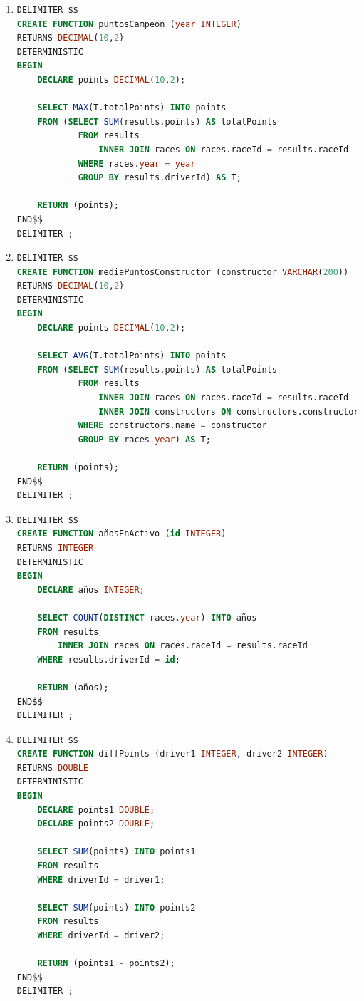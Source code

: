 \documentclass{db-practice}
\begin{document}
\begin{enumerate}
\item
\begin{lstlisting}[language=SQL]
DELIMITER $$
CREATE FUNCTION puntosCampeon (year INTEGER)
RETURNS DECIMAL(10,2)
DETERMINISTIC
BEGIN
    DECLARE points DECIMAL(10,2);

    SELECT MAX(T.totalPoints) INTO points
    FROM (SELECT SUM(results.points) AS totalPoints
            FROM results
                INNER JOIN races ON races.raceId = results.raceId
            WHERE races.year = year
            GROUP BY results.driverId) AS T;
            
    RETURN (points);
END$$
DELIMITER ;
\end{lstlisting}

\item
\begin{lstlisting}[language=SQL]
DELIMITER $$
CREATE FUNCTION mediaPuntosConstructor (constructor VARCHAR(200))
RETURNS DECIMAL(10,2)
DETERMINISTIC
BEGIN
    DECLARE points DECIMAL(10,2);

    SELECT AVG(T.totalPoints) INTO points
    FROM (SELECT SUM(results.points) AS totalPoints
            FROM results
                INNER JOIN races ON races.raceId = results.raceId
                INNER JOIN constructors ON constructors.constructorId = results.constructorId
            WHERE constructors.name = constructor
            GROUP BY races.year) AS T;
            
    RETURN (points);
END$$
DELIMITER ;
\end{lstlisting}

\item
\begin{lstlisting}[language=SQL]
DELIMITER $$
CREATE FUNCTION añosEnActivo (id INTEGER)
RETURNS INTEGER
DETERMINISTIC
BEGIN
    DECLARE años INTEGER;

    SELECT COUNT(DISTINCT races.year) INTO años 
    FROM results
        INNER JOIN races ON races.raceId = results.raceId
    WHERE results.driverId = id;
            
    RETURN (años);
END$$
DELIMITER ;
\end{lstlisting}

\item
\begin{lstlisting}[language=SQL]
DELIMITER $$
CREATE FUNCTION diffPoints (driver1 INTEGER, driver2 INTEGER)
RETURNS DOUBLE
DETERMINISTIC
BEGIN
    DECLARE points1 DOUBLE;
    DECLARE points2 DOUBLE;

    SELECT SUM(points) INTO points1
    FROM results
    WHERE driverId = driver1;
    
    SELECT SUM(points) INTO points2
    FROM results
    WHERE driverId = driver2;
            
    RETURN (points1 - points2);
END$$
DELIMITER ;    
\end{lstlisting}
\end{enumerate}
\end{document}

